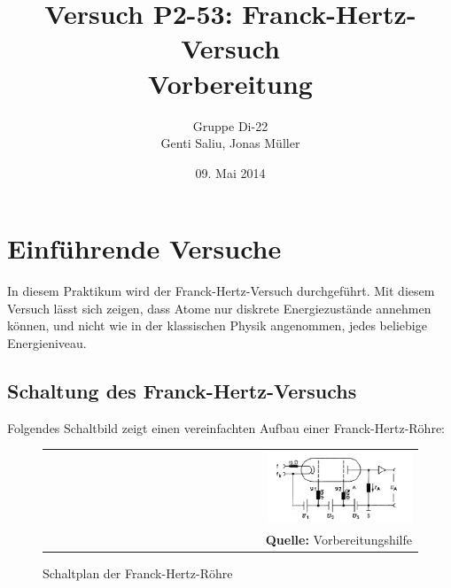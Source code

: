 \documentclass[a4paper,titlepage]{scrartcl}
\title{Versuch P2-53: Franck-Hertz-Versuch\\Vorbereitung}
\author{Gruppe Di-22\\Genti Saliu, Jonas Müller}
\date{09. Mai 2014}
\numberwithin{equation}{section}
\begin{document}
	\begin{titlepage}
		\maketitle
		\thispagestyle{empty}
	\end{titlepage}
	
\newpage
{}
\tableofcontents

\newpage
{}

\section{Einführende Versuche}
In diesem Praktikum wird der Franck-Hertz-Versuch durchgeführt. Mit diesem Versuch lässt sich zeigen, dass Atome nur diskrete Energiezustände annehmen können, und nicht wie in der klassischen Physik angenommen, jedes beliebige Energieniveau.

\subsection{Schaltung des Franck-Hertz-Versuchs}

Folgendes Schaltbild zeigt einen vereinfachten Aufbau einer Franck-Hertz-Röhre:

\begin{figure}[H]
	\centering
	\begin{tabular}{@{}r@{}}
		\includegraphics[width=0.4\textwidth]{bilder/schaltplan.jpg}\\
		\footnotesize\sffamily\textbf{Quelle:} Vorbereitungshilfe \cite{vorbereitungshilfe}
	\end{tabular}
	\caption{Schaltplan der Franck-Hertz-Röhre}
\end{figure}
\end{document}
